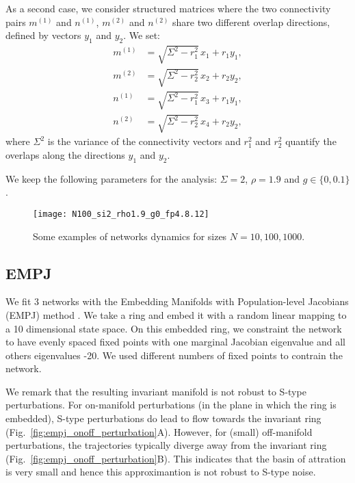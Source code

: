 \documentclass{article} %
\newcounter{ct}
\theoremstyle{definition}
\theoremstyle{remark}
\begin{document}
As a second case, we consider structured matrices where the two connectivity pairs \( m^{(1)} \) and \( n^{(1)} \), \( m^{(2)} \) and \( n^{(2)} \) share two different overlap directions, defined by vectors \( y_1 \) and \( y_2 \). We set:
\begin{align}
    m^{(1)} &= \sqrt{\Sigma^2 - r_1^2} \, x_1 + r_1 y_1, \\
    m^{(2)} &= \sqrt{\Sigma^2 - r_2^2} \, x_2 + r_2 y_2, \\
    n^{(1)} &= \sqrt{\Sigma^2 - r_1^2} \, x_3 + r_1 y_1, \\
    n^{(2)} &= \sqrt{\Sigma^2 - r_2^2} \, x_4 + r_2 y_2,
\end{align}
where \( \Sigma^2 \) is the variance of the connectivity vectors and \( r_1^2 \) and \( r_2^2 \) quantify the overlaps along the directions \( y_1 \) and \( y_2 \).

We keep the following parameters for the analysis:
$\Sigma=2$,
$\rho=1.9$ and
$g\in\{0, 0.1\}$.


\begin{figure}[h]
\centering
\texttt{[image: N100\_si2\_rho1.9\_g0\_fp4.8.12]}
\caption{Some examples of networks dynamics for sizes $N=10,100,1000$.}
\label{fig:low_rank_examples}
\end{figure}





\subsection{EMPJ}\label{sec:supp:empj}
We fit 3 networks with the Embedding Manifolds with Population-level Jacobians (EMPJ) method \citep{pollock2020}.
We take a ring and embed it with a random linear mapping to a 10 dimensional state space.
On this embedded ring, we constraint the network to have evenly spaced fixed points with one marginal Jacobian eigenvalue and all others eigenvalues -20.
We used different numbers of fixed points to contrain the network.


We remark that the resulting invariant manifold is not robust to S-type perturbations.
For on-manifold perturbations (in the plane in which the ring is embedded), S-type perturbations do lead to flow towards the invariant ring (Fig.~\ref{fig:empj_onoff_perturbation}A).
However, for (small) off-manifold perturbations, the trajectories typically diverge away from the invariant ring (Fig.~\ref{fig:empj_onoff_perturbation}B).
This indicates that the basin of attration is very small and hence this approximantion is not robust to S-type noise.
\end{document}
